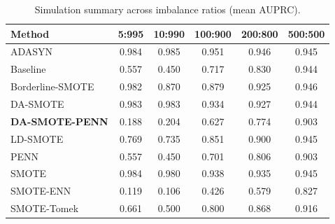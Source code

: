 \begin{table}[htb]
\centering
\caption{Simulation summary across imbalance ratios (mean AUPRC).}
\label{tab:simulation_summary}
\small
\begin{tabular}{lccccc}
\toprule
Method & 5:995 & 10:990 & 100:900 & 200:800 & 500:500
\\
\midrule
ADASYN & 0.984 & 0.985 & 0.951 & 0.946 & 0.945
\\
Baseline & 0.557 & 0.450 & 0.717 & 0.830 & 0.944
\\
Borderline-SMOTE & 0.982 & 0.870 & 0.879 & 0.925 & 0.946
\\
DA-SMOTE & 0.983 & 0.983 & 0.934 & 0.927 & 0.944
\\
\textbf{DA-SMOTE-PENN} & 0.188 & 0.204 & 0.627 & 0.774 & 0.903
\\
LD-SMOTE & 0.769 & 0.735 & 0.851 & 0.900 & 0.945
\\
PENN & 0.557 & 0.450 & 0.701 & 0.806 & 0.903
\\
SMOTE & 0.984 & 0.980 & 0.938 & 0.935 & 0.945
\\
SMOTE-ENN & 0.119 & 0.106 & 0.426 & 0.579 & 0.827
\\
SMOTE-Tomek & 0.661 & 0.500 & 0.800 & 0.868 & 0.916
\\
\bottomrule
\end{tabular}
\end{table}
